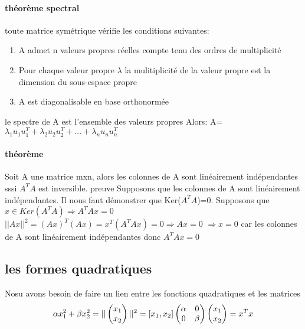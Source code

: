 \documentclass[a4paper,10pt]{article}
\begin{document}
\paragraph{théorème spectral}
toute matrice symétrique vérifie les conditions suivantes:
\begin{enumerate}
 \item A admet n valeurs propres réelles compte tenu des ordres de multiplicité
 \item Pour chaque valeur propre $\lambda$ la mulitiplicité de la valeur propre est la dimension du sous-espace propre
 \item A est diagonalisable en base orthonormée
\end{enumerate}
le spectre de A est l'ensemble des valeurs propres
\newline
Alors: A=$\lambda_1u_1u_1^T+\lambda_2u_2u_2^T+...+\lambda_nu_nu_n^T$
\paragraph{théorème}
Soit A une matrice mxn, alors les colonnes de A sont linéairement indépendantes sssi $A^TA$ est inversible.
\newline
preuve
\newline
Supposons que les colonnes de A sont linéairement indépendantes. Il nous faut démonstrer que Ker($A^TA$)=0.
\newline
Supposons que $x\in Ker(A^TA)\Rightarrow A^TAx=0$
\newline
$||Ax||^2=(Ax)^T(Ax)=x^T(A^TAx)=0\Rightarrow Ax=0$
\newline
$\Rightarrow x=0$ car les colonnes de A sont linéairement indépendantes donc $A^TAx=0$
\subsection{les formes quadratiques}
Nosu avons besoin de faire un lien entre les fonctions quadratiques et les matrices
\newline
\[
\alpha x_1^2+\beta x_2^2=||\begin{pmatrix}
               x_1\cr
               x_2\cr
              \end{pmatrix}
||^2=[x_1,x_2]\begin{pmatrix}
               \alpha&0\cr
               0&\beta\cr
              \end{pmatrix}
\begin{pmatrix}
               x_1\cr
               x_2\cr
              \end{pmatrix}
=x^Tx
\]
\end{document}
